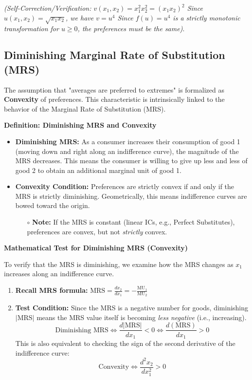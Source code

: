 \documentclass{article}
\begin{document}
\textit{(Self-Correction/Verification: $v(x_1, x_2) = x_1^2 x_2^2 = (x_1 x_2)^2$ Since $u(x_1, x_2) = \sqrt{x_1 x_2}$, we have $v = u^4$ Since $f(u)=u^4$ is a strictly monotonic transformation for $u \geq 0$, the preferences must be the same)}.

\subsection{Diminishing Marginal Rate of Substitution (MRS)}

The assumption that "averages are preferred to extremes" is formalized as \textbf{Convexity} of preferences. This characteristic is intrinsically linked to the behavior of the Marginal Rate of Substitution (MRS).

\textbf{Definition: Diminishing MRS and Convexity}

\begin{itemize}
    \item \textbf{Diminishing MRS:} As a consumer increases their consumption of good 1 (moving down and right along an indifference curve), the magnitude of the MRS decreases. This means the consumer is willing to give up less and less of good 2 to obtain an additional marginal unit of good 1.
    \item \textbf{Convexity Condition:} Preferences are strictly convex if and only if the MRS is strictly diminishing. Geometrically, this means indifference curves are bowed toward the origin.
    \begin{itemize}
        \item[$\circ$] \textbf{Note:} If the MRS is constant (linear ICs, e.g., Perfect Substitutes), preferences are convex, but not \textit{strictly} convex.
    \end{itemize}
\end{itemize}

\textbf{Mathematical Test for Diminishing MRS (Convexity)}

To verify that the MRS is diminishing, we examine how the MRS changes as $x_1$ increases along an indifference curve.

\begin{enumerate}
    \item \textbf{Recall MRS formula:} $\text{MRS} = \frac{dx_2}{dx_1} = -\frac{\text{MU}_1}{\text{MU}_2}$
    \item \textbf{Test Condition:} Since the MRS is a negative number for goods, diminishing $|\text{MRS}|$ means the MRS value itself is becoming \textit{less negative} (i.e., increasing). $$\text{Diminishing MRS} \iff \frac{d|\text{MRS}|}{dx_1} < 0 \iff \frac{d(\text{MRS})}{dx_1} > 0$$ This is also equivalent to checking the sign of the second derivative of the indifference curve: $$\text{Convexity} \iff \frac{d^2x_2}{dx_1^2} > 0$$
\end{enumerate}
\end{document}
